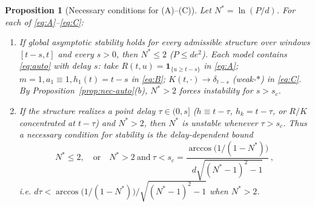 \documentclass[12pt]{article}
\newtheorem{proposition}{Proposition}
\theoremstyle{definition}
\begin{document}
\begin{proposition}[Necessary conditions for (A)--(C)]\label{prop:nec-nonauto}
Let $N^*=\ln(P/d)$. For each of \eqref{eq:A}--\eqref{eq:C}:
\begin{enumerate}
\item[\rm(1)] If global asymptotic stability holds for \emph{every} admissible
structure over windows $[t-s,t]$ and every $s>0$, then $N^*\le2$
($P\le de^2$). Each model contains \eqref{eq:auto} with delay $s$:
take $R(t,u)=\mathbf1_{\{u\ge t-s\}}$ in \eqref{eq:A}; $m=1,a_1\equiv1,
h_1(t)=t-s$ in \eqref{eq:B}; $K(t,\cdot)\to\delta_{t-s}$ (weak-$*$) in
\eqref{eq:C}. By Proposition~\ref{prop:nec-auto}(b), $N^*>2$ forces instability
for $s>s_c$.
\item[\rm(2)] If the structure realizes a point delay $\tau\in(0,s]$
($h\equiv t-\tau$, $h_k=t-\tau$, or $R/K$ concentrated at $t-\tau$) and
$N^*>2$, then $N^*$ is unstable whenever $\tau>s_c$. Thus a necessary condition
for stability is the delay-dependent bound
\begin{equation}\label{eq:necbound}
  N^*\le2,\quad\text{or}\quad
  N^*>2\ \text{and}\ \tau<s_c
  =\frac{\arccos\!\bigl(1/(1-N^*)\bigr)}{d\sqrt{(N^*-1)^2-1}}\,,
\end{equation}
i.e. $d\tau<\arccos\!\bigl(1/(1-N^*)\bigr)/\sqrt{(N^*-1)^2-1}$ when $N^*>2$.
\end{enumerate}
\end{proposition}
\end{document}
